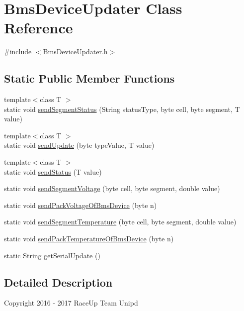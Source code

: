 \hypertarget{class_bms_device_updater}{}\section{Bms\+Device\+Updater Class Reference}
\label{class_bms_device_updater}


{\ttfamily \#include $<$Bms\+Device\+Updater.\+h$>$}

\subsection*{Static Public Member Functions}
\begin{DoxyCompactItemize}
\item 
{\footnotesize template$<$class T $>$ }\\static void \hyperlink{class_bms_device_updater_a6ddc61da65da16ff6c24995f43f0a6c1}{send\+Segment\+Status} (String status\+Type, byte cell, byte segment, T value)
\item 
{\footnotesize template$<$class T $>$ }\\static void \hyperlink{class_bms_device_updater_a9449da7019249fb3ce825c12fb61c134}{send\+Update} (byte type\+Value, T value)
\item 
{\footnotesize template$<$class T $>$ }\\static void \hyperlink{class_bms_device_updater_a5cc748a486645d1af6f675274f0d29ae}{send\+Status} (T value)
\item 
static void \hyperlink{class_bms_device_updater_adea56427bf1d465febdf5063fe72f47e}{send\+Segment\+Voltage} (byte cell, byte segment, double value)
\item 
static void \hyperlink{class_bms_device_updater_a46d75db7fc11f3ab833080a08fea0d8a}{send\+Pack\+Voltage\+Of\+Bms\+Device} (byte n)
\item 
static void \hyperlink{class_bms_device_updater_a8a1496a8b64045bc0a21d253de3dd408}{send\+Segment\+Temperature} (byte cell, byte segment, double value)
\item 
static void \hyperlink{class_bms_device_updater_adaeff0fa9bc196fbce908b5d741fea3a}{send\+Pack\+Temperature\+Of\+Bms\+Device} (byte n)
\item 
static String \hyperlink{class_bms_device_updater_acbdc84250bda4de22237e81cc1d3736f}{get\+Serial\+Update} ()
\end{DoxyCompactItemize}


\subsection{Detailed Description}
Copyright 2016 -\/ 2017 Race\+Up Team Unipd

